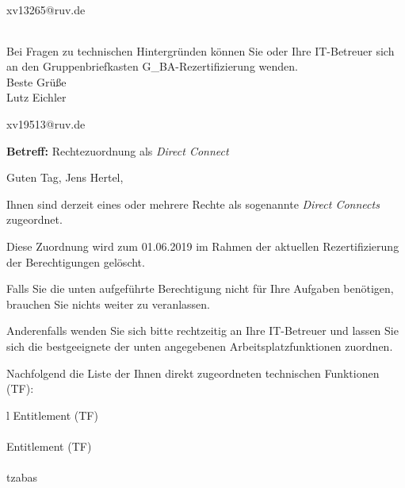 \documentclass[a4paper,landscape,12pt]{letter}
\begin{document}
\begin{letter}{xv13265@ruv.de\hfill \break}
\begin{tiny}
\begin{longtable}{|p{35mm}|p{15mm}|p{25mm}|p{10mm}|p{40mm}|p{50mm}|p{50mm}|}
\hline
		\end{longtable}
		\end{tiny}
	
\begin{minipage}{\textwidth}
			Bei Fragen zu technischen Hintergründen können Sie 
			oder Ihre IT-Betreuer sich an den Gruppenbriefkasten 
			G\_BA-Rezertifizierung
			wenden.\\
			\linebreak
			Beste Grüße\\
			Lutz Eichler
	\end{minipage}
	\end{letter}
	
\begin{letter}{xv19513@ruv.de\hfill \break}
\begin{normalsize}
	\opening{\textbf{Betreff:} Rechtezuordnung als \emph{Direct Connect}}
	\begin{normalsize} \hfill
	\end{normalsize}

	\begin{normalsize}
		Guten Tag, 
	Jens Hertel, \hfill \break
	\end{normalsize}
	\end{normalsize}
	
\begin{normalsize}
	Ihnen sind derzeit eines oder mehrere Rechte als sogenannte \emph{Direct Connects} zugeordnet.
	
	Diese Zuordnung wird zum 01.06.2019 im Rahmen der aktuellen Rezertifizierung der Berechtigungen gelöscht.
	
	Falls Sie die unten aufgeführte Berechtigung nicht für Ihre Aufgaben benötigen, 
	brauchen Sie nichts weiter zu veranlassen.
	
	Anderenfalls wenden Sie sich bitte rechtzeitig an Ihre IT-Betreuer 
	und lassen Sie sich die bestgeeignete der unten angegebenen Arbeitsplatzfunktionen zuordnen.
	\end{normalsize}
	
\begin{normalsize}
	Nachfolgend die Liste der Ihnen direkt zugeordneten technischen Funktionen (TF):

	\begin{longtable}{l}
		Entitlement (TF) \\ \hline
		\endfirsthead
		\\\hline
		Entitlement (TF) \\ \hline
		\endhead %
		\multicolumn{1}{r@{}}{Fortsetzung \ldots}\\
		\endfoot
		\hline
		\endlastfoot
	tzabas\\
	\end{longtable}
	\end{normalsize}
	

\end{letter}
\end{document}
